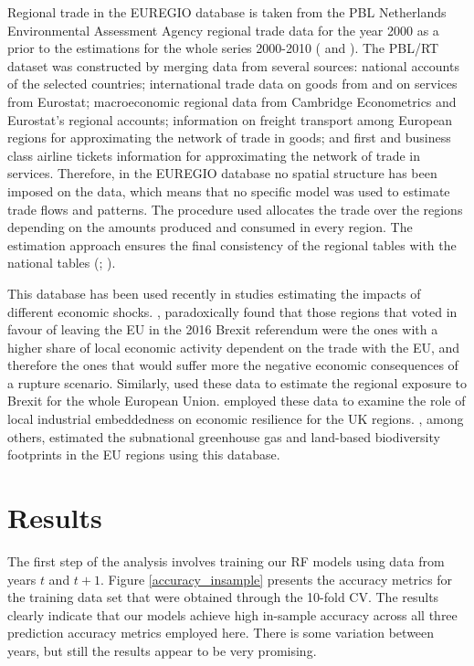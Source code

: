 \documentclass[sigconf]{acmart}
\begin{document}
Regional trade in the EUREGIO database is taken from the PBL Netherlands
Environmental Assessment Agency regional trade data for the year 2000 as
a prior to the estimations for the whole series 2000-2010
(\citet{thissen2013integrated} and \citet{thissen2013european}). The
PBL/RT dataset was constructed by merging data from several sources:
national accounts of the selected countries; international trade data on
goods from \citet{feenstra2005world} and on services from Eurostat;
macroeconomic regional data from Cambridge Econometrics and Eurostat's
regional accounts; information on freight transport among European
regions for approximating the network of trade in goods; and first and
business class airline tickets information for approximating the network
of trade in services. Therefore, in the EUREGIO database no spatial
structure has been imposed on the data, which means that no specific
model was used to estimate trade flows and patterns. The procedure used
allocates the trade over the regions depending on the amounts produced
and consumed in every region. The estimation approach ensures the final
consistency of the regional tables with the national tables
(\citet{thissen2018euregio}; \citet{ivanova2019regional}).

This database has been used recently in studies estimating the impacts
of different economic shocks. \citet{los2017mismatch}, paradoxically
found that those regions that voted in favour of leaving the EU in the
2016 Brexit referendum were the ones with a higher share of local
economic activity dependent on the trade with the EU, and therefore the
ones that would suffer more the negative economic consequences of a
rupture scenario. Similarly, \citet{chen2018continental} used these data
to estimate the regional exposure to Brexit for the whole European
Union. \citet{kitsos2019role} employed these data to examine the role of
local industrial embeddedness on economic resilience for the UK regions.
\citet{wilting2020subnational}, among others, estimated the subnational
greenhouse gas and land-based biodiversity footprints in the EU regions
using this database.

\hypertarget{sec:5}{%
	\section{Results}\label{sec:5}}

The first step of the analysis involves training our RF models using
data from years \(t\) and \(t + 1\). Figure \ref{accuracy_insample}
presents the accuracy metrics for the training data set that were
obtained through the 10-fold CV. The results clearly indicate that our
models achieve high in-sample accuracy across all three prediction
accuracy metrics employed here. There is some variation between years,
but still the results appear to be very promising.
\end{document}
